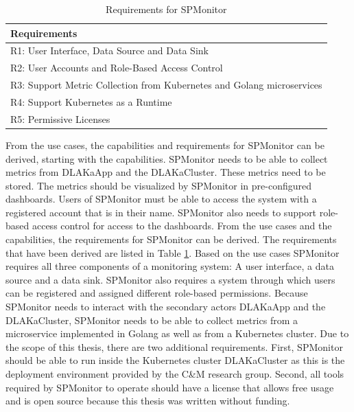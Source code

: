 \begin{table}[]
  \centering
  \begin{tabular}{l}
    Requirements                                                           \\
    \hline
    R1: User Interface, Data Source and Data Sink                          \\
    R2: User Accounts and Role-Based Access Control                        \\
    R3: Support Metric Collection from Kubernetes and Golang microservices \\
    R4: Support Kubernetes as a Runtime                                    \\
    R5: Permissive Licenses                                                \\
  \end{tabular}
  \caption{Requirements for SPMonitor}
  \label{tab:spmonitor_requirements}
\end{table}

From the use cases, the capabilities and requirements for SPMonitor can be
derived, starting with the capabilities. SPMonitor needs to be able to collect metrics
from DLAKaApp and the DLAKaCluster. These metrics need to be stored. The
metrics should be visualized by SPMonitor in pre-configured dashboards. Users
of SPMonitor must be able to access the system with a registered account that
is in their name. SPMonitor also needs to support role-based access control for
access to the dashboards. From the use cases and the capabilities, the
requirements for SPMonitor can be derived. The requirements that have been
derived are listed in Table \ref{tab:spmonitor_requirements}. Based on the use
cases SPMonitor requires all three components of a monitoring system: A user
interface, a data source and a data sink. SPMonitor also requires a system
through which users can be registered and assigned different role-based
permissions. Because SPMonitor needs to interact with the secondary actors
DLAKaApp and the DLAKaCluster, SPMonitor needs to be able to collect metrics
from a microservice implemented in Golang as well as from a Kubernetes cluster.
Due to the scope of this thesis, there are two additional requirements. First,
SPMonitor should be able to run inside the Kubernetes cluster DLAKaCluster as this
is the deployment environment provided by the C\&M research group.
Second, all tools required by SPMonitor to operate should have a license that
allows free usage and is open source because this thesis was written without funding.

